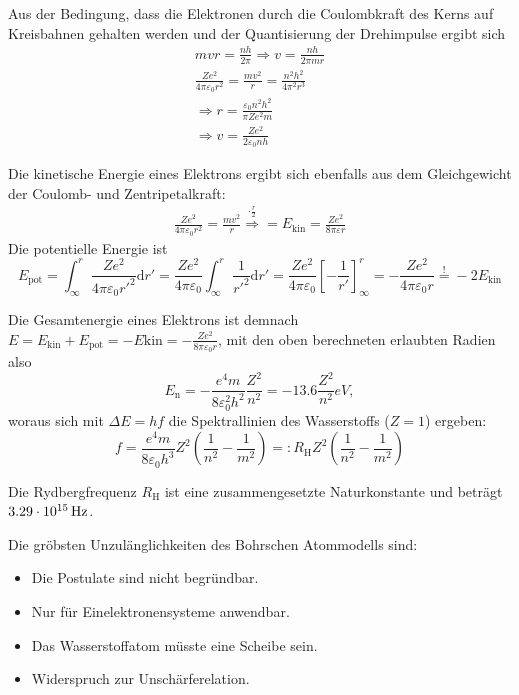 \documentclass[a4paper]{scrartcl}
\begin{document}
Aus der Bedingung, dass die Elektronen durch die Coulombkraft des Kerns auf Kreisbahnen gehalten werden und der Quantisierung der Drehimpulse ergibt sich
\begin{align*}
  mvr = \frac{nh}{2\pi} \Rightarrow v = \frac{nh}{2\pi mr}\\
  \frac{Ze^2}{4\pi\varepsilon_0 r^2} = \frac{mv^2}{r} = \frac{n^2h^2}{4\pi^2r^3}\\
  \Rightarrow r = \frac{\varepsilon_0 n^2 h^2}{\pi Z e^2m}\\
  \Rightarrow v = \frac{Ze^2}{2\varepsilon_0nh}
\end{align*}

Die kinetische Energie eines Elektrons ergibt sich ebenfalls aus dem Gleichgewicht der Coulomb- und Zentripetalkraft:
\begin{align*}
  \frac{Ze^2}{4\pi\varepsilon_0 r^2} = \frac{mv^2}{r} \stackrel{\cdot\frac{r}{2}}{\Rightarrow} = E_\text{kin} = \frac{Ze^2}{8\pi\varepsilon r}
\end{align*}
Die potentielle Energie ist
\begin{equation*}
  E_\text{pot} = \int_\infty^r \frac{Ze^2}{4\pi\varepsilon_0 r'^2} \text{d}r' = \frac{Ze^2}{4\pi\varepsilon_0} \int_\infty^r \frac{1}{r'^2} \text{d}r' = \frac{Ze^2}{4\pi\varepsilon_0} \left[ -\frac{1}{r'} \right]_\infty^r = -\frac{Ze^2}{4\pi\varepsilon_0 r} \stackrel{!}{=} -2 E_\text{kin}
\end{equation*}

Die Gesamtenergie eines Elektrons ist demnach $E = E_\text{kin} + E_\text{pot} = -E\text{kin} = -\frac{Ze^2}{8\pi\varepsilon_0 r}$, mit den oben berechneten erlaubten Radien also
\begin{equation*}
  E_\text{n} = -\frac{e^4m}{8\varepsilon_0^2h^2}\frac{Z^2}{n^2} = -13.6 \frac{Z^2}{n^2}\unit{eV},
\end{equation*}
woraus sich mit $\Delta E = hf$ die Spektrallinien des Wasserstoffs ($Z=1$) ergeben:
\begin{equation*}
  f = \frac{e^4m}{8\varepsilon_0h^3} Z^2 \left( \frac{1}{n^2} - \frac{1}{m^2} \right) =: R_\text{H} Z^2 \left( \frac{1}{n^2} - \frac{1}{m^2} \right)
\end{equation*}

Die Rydbergfrequenz $R_\text{H}$ ist eine zusammengesetzte Naturkonstante und beträgt $\unit[3.29\cdot 10^{15}]{Hz}$.

Die gröbsten Unzulänglichkeiten des Bohrschen Atommodells sind:
\begin{itemize}[noitemsep]
  \item Die Postulate sind nicht begründbar.
  \item Nur für Einelektronensysteme anwendbar.
  \item Das Wasserstoffatom müsste eine Scheibe sein.
  \item Widerspruch zur Unschärferelation.
\end{itemize}
\end{document}
